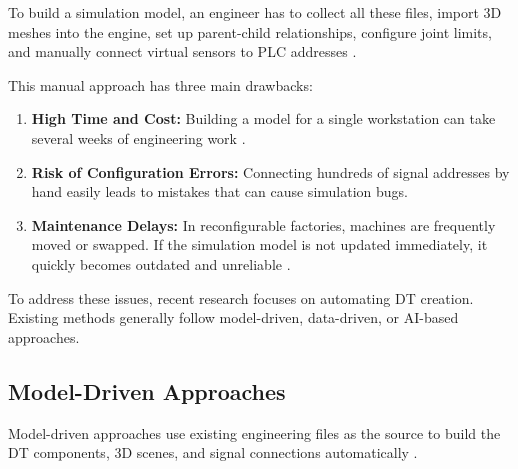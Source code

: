To build a simulation model, an engineer has to collect all these files, import 3D meshes into the engine, set up parent-child relationships, configure joint limits, and manually connect virtual sensors to \gls{PLC} addresses \cite{Alexopoulos2025,Koch2024}.

This manual approach has three main drawbacks:
\begin{enumerate}
    \item \textbf{High Time and Cost:} Building a model for a single workstation can take several weeks of engineering work \cite{Garcia2023}.
    \item \textbf{Risk of Configuration Errors:} Connecting hundreds of signal addresses by hand easily leads to mistakes that can cause simulation bugs.
    \item \textbf{Maintenance Delays:} In reconfigurable factories, machines are frequently moved or swapped. If the simulation model is not updated immediately, it quickly becomes outdated and unreliable \cite{Ahvanouee2025,Herzog2025}.
\end{enumerate}

To address these issues, recent research focuses on automating \gls{DT} creation. Existing methods generally follow model-driven, data-driven, or \gls{AI}-based approaches.

\subsection{Model-Driven Approaches}

Model-driven approaches use existing engineering files as the source to build the \gls{DT} components, 3D scenes, and signal connections automatically \cite{Luder2020,Ahvanouee2025}.

